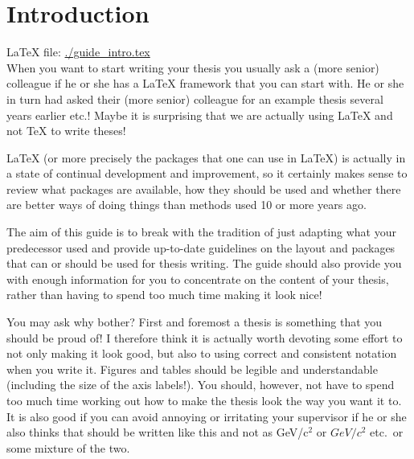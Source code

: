 \chapter{Introduction}
\label{sec:intro}

\LaTeX{} file: \url{./guide_intro.tex}\\[1ex]
\noindent
When you want to start writing your thesis you usually ask a (more
senior) colleague if he or she has a \gls{LaTeX} framework that you can
start with. He or she in turn had asked their (more senior) colleague
for an example thesis several years earlier etc.! Maybe it is
surprising that we are actually using \LaTeX{} and not \TeX{} to write
theses!

\LaTeX{} (or more precisely the packages that one
can use in \LaTeX) is actually in a state of continual development
and improvement, so it certainly makes sense to review what packages
are available, how they should be used and whether there are better
ways of doing things than methods used 10 or more years ago.

The aim of this guide is to break with the tradition of just adapting
what your predecessor used and provide up-to-date guidelines on the
layout and packages that can or should be used for thesis writing. The
guide should also provide you with enough information for you to
concentrate on the content of your thesis, rather than having to spend
too much time making it look nice!

You may ask why bother? First and foremost a thesis is something that
you should be proud of! I therefore think it is actually worth
devoting some effort to not only making it look good, but also to
using correct and consistent notation when you write it. Figures and
tables should be legible and understandable (including the size of the
axis labels!). You should, however, not have to spend too much time
working out how to make the thesis look the way you want it to. It is
also good if you can avoid annoying or irritating your supervisor if he
or she also thinks that \si{\GeVovercsq} should be written like this and
not as GeV/c$^{2}$ or $GeV/c^{2}$ etc.\ or some mixture of the two.

